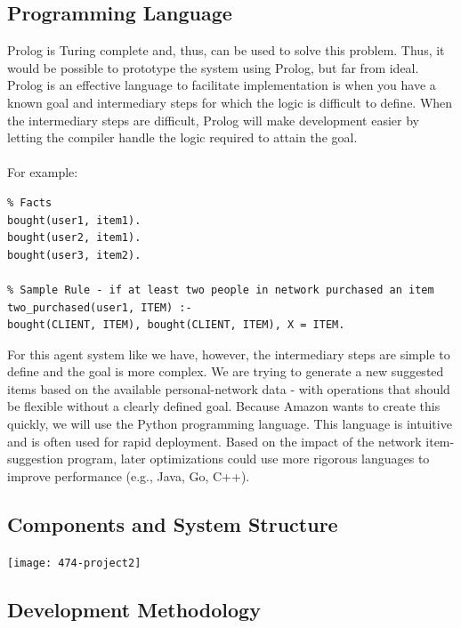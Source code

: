 \documentclass[12pt,a4paper]{article}
\begin{document}
	\subsection*{Programming Language}
		Prolog is Turing complete and, thus, can be used to solve this problem. Thus, it would be possible to prototype the system using Prolog, but far from ideal. Prolog is an effective language to facilitate implementation is when you have a known goal and intermediary steps for which the logic is difficult to define. When the intermediary steps are difficult, Prolog will make development easier by letting the compiler handle the logic required to attain the goal. 
		\\\\
		For example:
\begin{verbatim}
% Facts
bought(user1, item1).
bought(user2, item1).
bought(user3, item2).

% Sample Rule - if at least two people in network purchased an item
two_purchased(user1, ITEM) :- 
bought(CLIENT, ITEM), bought(CLIENT, ITEM), X = ITEM.
\end{verbatim}
		For this agent system like we have, however, the intermediary steps are simple to define and the goal is more complex. We are trying to generate a new suggested items based on the available personal-network data - with operations that should be flexible without a clearly defined goal. Because Amazon wants to create this quickly, we will use the Python programming language. This language is intuitive and is often used for rapid deployment. Based on the impact of the network item-suggestion program, later optimizations could use more rigorous languages to improve performance (e.g., Java, Go, C++).
		
		
		\subsection*{Components and System Structure}
		
		\begin{center}
			\texttt{[image: 474-project2]}
		\end{center}
		
		
		\subsection*{Development Methodology}
		
\end{document}
